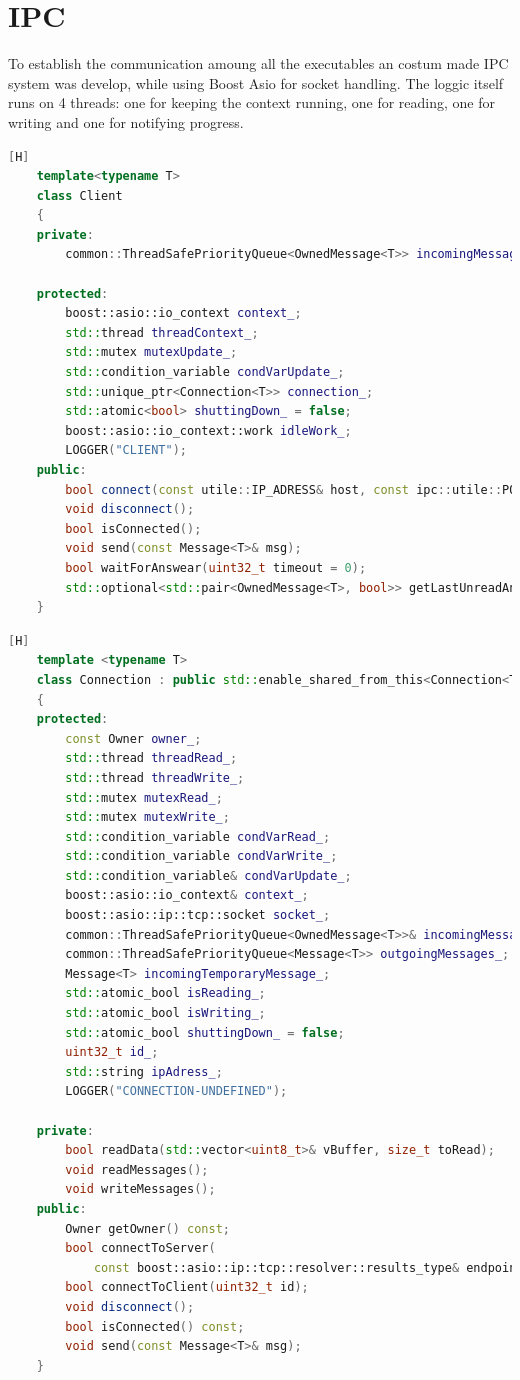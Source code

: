 \documentclass[17pt]{report}
\begin{document}
\pagebreak
\section{IPC}
\indent \indent
To establish the communication amoung all the executables an costum made IPC system
was develop, while using Boost Asio for socket handling. The loggic 
itself runs on 4 threads: one for keeping the context running, one for reading,
one for writing and one for notifying progress.


\begin{lstlisting}[language = C++][H]
    template<typename T>
    class Client
    {
    private:
        common::ThreadSafePriorityQueue<OwnedMessage<T>> incomingMessages_;

    protected:
        boost::asio::io_context context_;
        std::thread threadContext_;
        std::mutex mutexUpdate_;
        std::condition_variable condVarUpdate_;
        std::unique_ptr<Connection<T>> connection_;
        std::atomic<bool> shuttingDown_ = false;
        boost::asio::io_context::work idleWork_;
        LOGGER("CLIENT");
    public:
        bool connect(const utile::IP_ADRESS& host, const ipc::utile::PORT port);
        void disconnect();
        bool isConnected();
        void send(const Message<T>& msg);
        bool waitForAnswear(uint32_t timeout = 0);
        std::optional<std::pair<OwnedMessage<T>, bool>> getLastUnreadAnswear();
    }
\end{lstlisting}

\pagebreak

\begin{lstlisting}[language = C++][H]
    template <typename T>
    class Connection : public std::enable_shared_from_this<Connection<T>>
    {
    protected:
        const Owner owner_;
        std::thread threadRead_;
        std::thread threadWrite_;
        std::mutex mutexRead_;
        std::mutex mutexWrite_;
        std::condition_variable condVarRead_;
        std::condition_variable condVarWrite_;
        std::condition_variable& condVarUpdate_;
        boost::asio::io_context& context_;
        boost::asio::ip::tcp::socket socket_;
        common::ThreadSafePriorityQueue<OwnedMessage<T>>& incomingMessages_;
        common::ThreadSafePriorityQueue<Message<T>> outgoingMessages_;
        Message<T> incomingTemporaryMessage_;
        std::atomic_bool isReading_;
        std::atomic_bool isWriting_;
        std::atomic_bool shuttingDown_ = false;
        uint32_t id_;
        std::string ipAdress_;
        LOGGER("CONNECTION-UNDEFINED");

    private:
        bool readData(std::vector<uint8_t>& vBuffer, size_t toRead);
        void readMessages();
        void writeMessages();
    public:
        Owner getOwner() const;
        bool connectToServer(
            const boost::asio::ip::tcp::resolver::results_type& endpoints);
        bool connectToClient(uint32_t id);
        void disconnect();
        bool isConnected() const;
        void send(const Message<T>& msg);
    }
\end{lstlisting}
\end{document}
